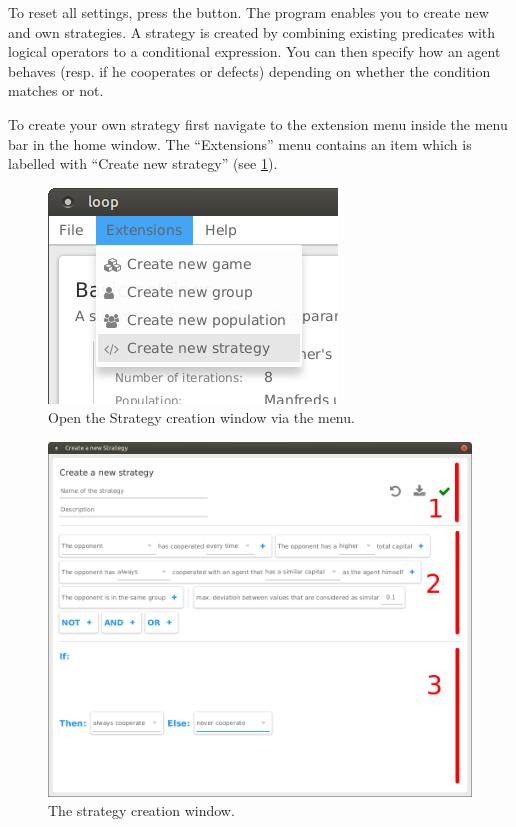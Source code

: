 \documentclass[parskip=full,11pt]{scrartcl}
\newlength\myheight
\newlength\mydepth
\newcommand*\inlinegraphics[1]{%
  \settototalheight\myheight{Xygp}%
  \settodepth\mydepth{Xygp}%
  \raisebox{-1.8\mydepth}{\texttt{[image: \#1]}}%
}
\begin{document}
To reset all settings, press the  \inlinegraphics{img_manual/rotate_left_button.png} button.
The program enables you to create new and own strategies. A strategy is created by combining existing predicates with logical operators to a conditional expression. You can then specify how an agent behaves (resp. if he cooperates or defects) depending on whether the condition matches or not.

To create your own strategy first navigate to the extension menu inside the menu bar in the home window. The \enquote{Extensions} menu contains an item which is labelled with \enquote{Create new strategy} (see \ref{fig:strategy_menu}).

\begin{figure}[h]
	\centering
	\includegraphics[width=0.2\linewidth]{img_manual/strategy_menu.png}
	\caption{Open the Strategy creation window via the menu.}
	\label{fig:strategy_menu}
\end{figure}


\begin{figure}[h]
	\centering
	\includegraphics[width=0.8\linewidth]{img_manual/strategy_window.png}
	\caption{The strategy creation window.}
	\label{fig:strategy_window}
\end{figure}
\end{document}
